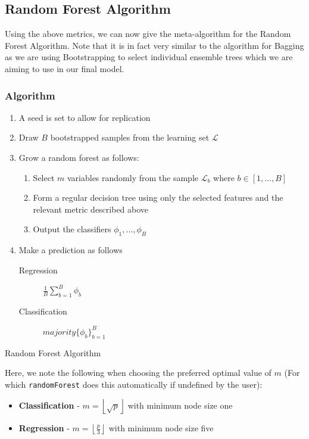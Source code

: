 \documentclass[11pt,a4paper]{report}
\begin{document}
\subsection{Random Forest Algorithm}
Using the above metrics, we can now give the meta-algorithm for the Random Forest Algorithm. Note that it is in fact very similar to the algorithm for Bagging as we are using Bootstrapping to select individual ensemble trees which we are aiming to use in our final model.
\subsubsection{Algorithm}
\begin{algorithm}
\SetAlgoLined
\begin{enumerate}
    \item A seed is set to allow for replication
    
    \item Draw $B$ bootstrapped samples from the learning set $\mathcal{L}$
        
    \item Grow a random forest as follows:
    \begin{enumerate}
        \item Select $m$ variables randomly from the sample $\mathcal{L}_b$ where $b \in [1, \dots, B]$
        
        \item Form a regular decision tree using only the selected features and the relevant metric described above
        
        \item Output the classifiers $\phi_1, \dots, \phi_B$
    \end{enumerate}
    
    \item Make a prediction as follows
    \begin{description}
        \item[Regression] $ \frac{1}{B} \sum_{b=1}^{B} \phi_b $
        
        \item[Classification] $majority \{\phi_b\}_{b=1}^{B}$
    \end{description}
\end{enumerate}
\caption{Random Forest Algorithm}
\end{algorithm}
Here, we note the following when choosing the preferred optimal value of $m$ (For which \texttt{randomForest} does this automatically if undefined by the user):
\begin{itemize}
    \item \textbf{Classification} - $m = \left \lfloor{\sqrt{p}} \right \rfloor$ with minimum node size one
    
    \item \textbf{Regression} - $m = \left \lfloor{\frac{p}{3}} \right \rfloor$ with minimum node size five
\end{itemize}
\end{document}
